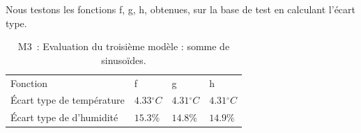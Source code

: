 \documentclass[11pt,a4paper]{article}
\begin{document}
Nous testons les fonctions f, g, h, obtenues, sur la base de test en calculant l'écart type.
\begin{table}[h]
\begin{center}
\begin{tabular}{llll}\hline
\hline
Fonction                             &f                         &g                       &h \\
Écart type de température & $4.33{}^{\circ}C$   & $4.31{}^{\circ}C$   &  $4.31{}^{\circ}C$ \\ 
Écart type de d'humidité    & $15.3\%$   & $14.8\%$   &  $14.9\%$   \\   
\hline 
\end{tabular}
\caption{M3~: Evaluation du troisième modèle : somme de sinusoïdes.}\label{tab:tesfgh}
\end{center}
\end{table}
\end{document}
